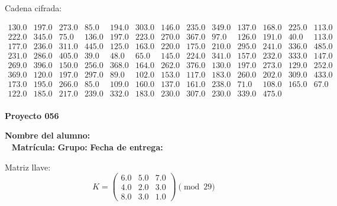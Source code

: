 \documentclass[12pt]{article}
\begin{document}
Cadena cifrada:
\begin{center}
$\begin{array}{lllllllllllll}
130.0 & 197.0 & 273.0 & 85.0 & 194.0 & 303.0 & 146.0 & 235.0 & 349.0 & 137.0 & 168.0 & 225.0 & 113.0\\
222.0 & 345.0 & 75.0 & 136.0 & 197.0 & 223.0 & 270.0 & 367.0 & 97.0 & 126.0 & 191.0 & 40.0 & 113.0\\
177.0 & 236.0 & 311.0 & 445.0 & 125.0 & 163.0 & 220.0 & 175.0 & 210.0 & 295.0 & 241.0 & 336.0 & 485.0\\
231.0 & 286.0 & 405.0 & 39.0 & 48.0 & 65.0 & 145.0 & 224.0 & 341.0 & 157.0 & 232.0 & 333.0 & 147.0\\
269.0 & 396.0 & 150.0 & 256.0 & 368.0 & 164.0 & 262.0 & 376.0 & 130.0 & 197.0 & 273.0 & 129.0 & 252.0\\
369.0 & 120.0 & 197.0 & 297.0 & 89.0 & 102.0 & 153.0 & 117.0 & 183.0 & 260.0 & 202.0 & 309.0 & 433.0\\
173.0 & 195.0 & 266.0 & 85.0 & 109.0 & 160.0 & 137.0 & 161.0 & 238.0 & 71.0 & 108.0 & 165.0 & 67.0\\
122.0 & 185.0 & 217.0 & 239.0 & 332.0 & 183.0 & 230.0 & 307.0 & 230.0 & 339.0 & 475.0\\
\end{array}$
\end{center}

\newpage


\textbf{Proyecto 056}

\textbf{Nombre del alumno:} \underline{\hspace{13cm}}\\\
\vspace{1cm}
\textbf{Matrícula:} \underline{\hspace{4cm}} \hspace{1cm}
\textbf{Grupo:} \underline{\hspace{2cm}}
\textbf{Fecha de entrega:} \underline{\hspace{2cm}}

\medskip

Matriz llave:
\[
K = \begin{pmatrix}
6.0 & 5.0 & 7.0\\
4.0 & 2.0 & 3.0\\
8.0 & 3.0 & 1.0
\end{pmatrix} \pmod{29}
\]
\end{document}
